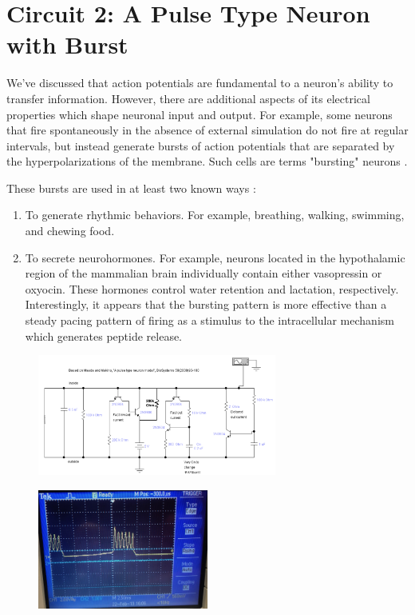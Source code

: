 \documentclass[12]{amsbook}
\newcommand\0{\mathbf{0}}
\newcommand\<{\langle}
\renewcommand\>{\rangle}
\begin{document}
\section{Circuit 2: A Pulse Type Neuron with Burst}

We've discussed that action potentials are fundamental to a neuron's ability to transfer information. However, there are additional aspects of its electrical properties which shape neuronal input and output. For example, some neurons that fire spontaneously in the absence of external simulation do not fire at regular intervals, but instead generate bursts of action potentials that are separated by the hyperpolarizations of the membrane. Such cells are terms "bursting" neurons \cite{levitan2015neuron}.

These bursts are used in at least two known ways \cite{levitan2015neuron}:

\begin{enumerate}
\item To generate rhythmic behaviors. For example, breathing, walking, swimming, and chewing food.	
\item To secrete neurohormones. For example, neurons located in the hypothalamic region of the mammalian brain individually contain either vasopressin or oxyocin. These hormones control water retention and lactation, respectively. Interestingly, it appears that the bursting pattern is more effective than a steady pacing pattern of firing as a stimulus to the intracellular mechanism which generates peptide release.
\end{enumerate}
 

\begin{figure}[H]
\includegraphics[width=0.7\textwidth]{burster_heart_cell}	
\end{figure}

\begin{figure}[H]
\includegraphics[width=0.5\textwidth]{burster_osc}	
\end{figure}
\end{document}
